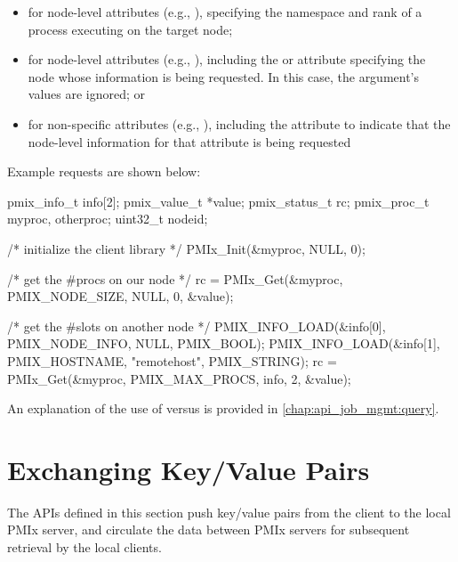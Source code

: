 \begin{itemize}
\item for node-level attributes (e.g., ), specifying the namespace and rank of a process executing on the target node;
\item for node-level attributes (e.g., ), including the  or  attribute specifying the node whose information is being requested. In this case, the  argument's values are ignored; or
\item for non-specific attributes (e.g., ), including the  attribute to indicate that the node-level information for that attribute is being requested
\end{itemize}

Example requests are shown below:

\cspecificstart
\begin{codepar}
pmix_info_t info[2];
pmix_value_t *value;
pmix_status_t rc;
pmix_proc_t myproc, otherproc;
uint32_t nodeid;

/* initialize the client library */
PMIx_Init(&myproc, NULL, 0);

/* get the #procs on our node */
rc = PMIx_Get(&myproc, PMIX_NODE_SIZE, NULL, 0, &value);

/* get the #slots on another node */
PMIX_INFO_LOAD(&info[0], PMIX_NODE_INFO, NULL, PMIX_BOOL);
PMIX_INFO_LOAD(&info[1], PMIX_HOSTNAME, "remotehost", PMIX_STRING);
rc = PMIx_Get(&myproc, PMIX_MAX_PROCS, info, 2, &value);

\end{codepar}
\cspecificend

\adviceuserstart
An explanation of the use of  versus  is provided in \ref{chap:api_job_mgmt:query}.
\adviceuserend

\section{Exchanging Key/Value Pairs}
\label{chap:api_kv_mgmt:exchange}

The APIs defined in this section push key/value pairs from the client to the local \ac{PMIx} server, and circulate the data between \ac{PMIx} servers for subsequent retrieval by the local clients.

\subsection{}


